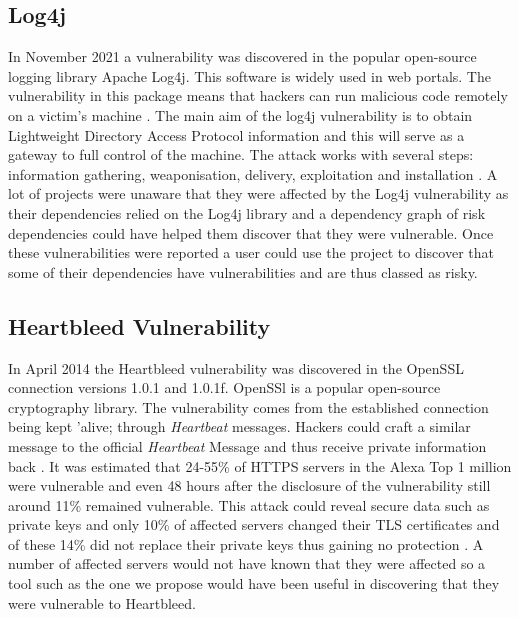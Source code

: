 \documentclass[conference]{IEEEtran}
\begin{document}
\subsection{Log4j}
In November 2021 a vulnerability was discovered in the popular open-source logging library Apache Log4j. This software is widely used in web portals. The vulnerability in this package means that hackers can run malicious code remotely on a victim's machine \cite{h_gupta_identification_2022}. The main aim of the log4j vulnerability is to obtain Lightweight Directory Access Protocol information and this will serve as a gateway to full control of the machine. The attack works with several steps: information gathering, weaponisation, delivery, exploitation and installation \cite{f_maulana_unmasking_2023}. A lot of projects were unaware that they were affected by the Log4j vulnerability as their dependencies relied on the Log4j library and a dependency graph of risk dependencies could have helped them discover that they were vulnerable. Once these vulnerabilities were reported a user could use the project to discover that some of their dependencies have vulnerabilities and are thus classed as risky. 

\subsection{Heartbleed Vulnerability}
In April 2014 the Heartbleed vulnerability was discovered in the OpenSSL connection versions 1.0.1 and 1.0.1f. OpenSSl is a popular open-source cryptography library. The vulnerability comes from the established connection being kept 'alive; through \textit{Heartbeat} messages. Hackers could craft a similar message to the official \textit{Heartbeat} Message and thus receive private information back \cite{s_kyatam_heartbleed_2017}. It was estimated that 24-55\% of HTTPS servers in the Alexa Top 1 million were vulnerable and even 48 hours after the disclosure of the vulnerability still around 11\% remained vulnerable. This attack could reveal secure data such as private keys and only 10\% of affected servers changed their TLS certificates and of these 14\% did not replace their private keys thus gaining no protection \cite{durumeric_matter_2014}. A number of affected servers would not have known that they were affected so a tool such as the one we propose would have been useful in discovering that they were vulnerable to Heartbleed. 
\end{document}
